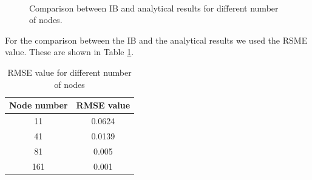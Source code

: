 \begin{figure}[H]
	\centering
	\quad
	\\
	\quad
	\caption{Comparison between IB and analytical results for different number of nodes.}
	\label{fig:C3_penalizationResultNodeNumber}
\end{figure}

For the comparison between the IB and the analytical results we used the RSME value. These are shown in Table \ref{table:C3_penalizationResultNodeNumberRMSE}.

\begin{table}[H]
\centering
\begin{tabular}{c | c}
	Node number & RMSE value \\ \hline \hline
	11 & 0.0624 \\ \hline
	41 & 0.0139 \\ \hline
	81 & 0.005 \\ \hline
	161 & 0.001
\end{tabular}
\caption{RMSE value for different number of nodes}
\label{table:C3_penalizationResultNodeNumberRMSE}
\end{table}

